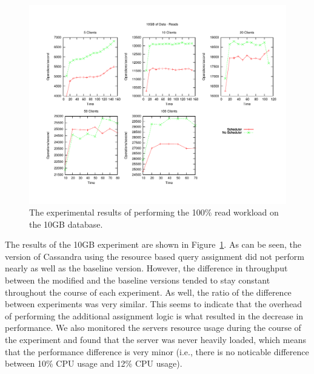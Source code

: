 \begin{figure}[t]
\centering
\includegraphics[scale=0.563]{images/10GB_Reads.pdf}
\vspace{-15pt}
\caption{The experimental results of performing the 100\% read workload on the 10GB database.}
\label{fig:10g_reads}
\end{figure}

The results of the 10GB experiment are shown in Figure~\ref{fig:10g_reads}. As can be seen, the version of Cassandra using the resource based query assignment did not perform nearly as well as the baseline version. However, the difference in throughput between the modified and the baseline versions tended to stay constant throughout the course of each experiment. As well, the ratio of the difference between experiments was very similar. This seems to indicate that the overhead of performing the additional assignment logic is what resulted in the decrease in performance. We also monitored the servers resource usage during the course of the experiment and found that the server was never heavily loaded, which means that the performance difference is very minor (i.e., there is no noticable difference between 10\% CPU usage and 12\% CPU usage).

